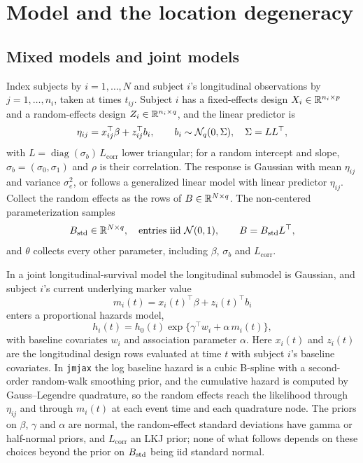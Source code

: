 \section{Model and the location degeneracy}\label{sec:model}

\subsection{Mixed models and joint models}\label{sec:setup}

Index subjects by $i = 1, \dots, N$ and subject $i$'s longitudinal
observations by $j = 1, \dots, n_i$, taken at times $t_{ij}$. Subject $i$
has a fixed-effects design $X_i \in \mathbb{R}^{n_i \times p}$ and a random-effects
design $Z_i \in \mathbb{R}^{n_i \times q}$, and the linear predictor is
\begin{equation}\label{eq:lp}
\eta_{ij} = x_{ij}^{\top}\beta + z_{ij}^{\top} b_i ,
\qquad b_i \sim \mathcal{N}_q(0, \Sigma), \quad \Sigma = L L^{\top},
\end{equation}
with $L = \operatorname{diag}(\sigma_b)\,L_{\mathrm{corr}}$ lower
triangular; for a random intercept and slope, $\sigma_b = (\sigma_0,
\sigma_1)$ and $\rho$ is their correlation. The response is Gaussian with mean $\eta_{ij}$ and variance
$\sigma_e^2$, or follows a generalized linear model with linear predictor
$\eta_{ij}$. Collect the random effects as the rows of $B \in \mathbb{R}^{N \times q}$.
The non-centered parameterization samples
\begin{equation}\label{eq:ncp}
B_{\mathrm{std}} \in \mathbb{R}^{N \times q}, \quad \text{entries iid } \mathcal{N}(0,1),
\qquad B = B_{\mathrm{std}} L^{\top},
\end{equation}
and $\theta$ collects every other parameter, including $\beta$,
$\sigma_b$ and $L_{\mathrm{corr}}$.

In a joint longitudinal-survival model the longitudinal submodel is
Gaussian, and subject $i$'s current underlying marker value
\begin{equation}\label{eq:traj}
m_i(t) = x_i(t)^{\top}\beta + z_i(t)^{\top} b_i
\end{equation}
enters a proportional hazards model,
\begin{equation}\label{eq:hazard}
h_i(t) = h_0(t)\exp\{\gamma^{\top} w_i + \alpha\, m_i(t)\},
\end{equation}
with baseline covariates $w_i$ and association parameter $\alpha$. Here
$x_i(t)$ and $z_i(t)$ are the longitudinal design rows evaluated at time
$t$ with subject $i$'s baseline covariates. In \texttt{jmjax} the log baseline
hazard is a cubic B-spline with a second-order random-walk smoothing prior,
and the cumulative hazard is computed by Gauss--Legendre quadrature, so the
random effects reach the likelihood through $\eta_{ij}$ and through
$m_i(t)$ at each event time and each quadrature node. The priors on
$\beta$, $\gamma$ and $\alpha$ are normal, the random-effect standard
deviations have gamma or half-normal priors, and $L_{\mathrm{corr}}$ an LKJ
prior; none of what follows depends on these choices beyond the prior on
$B_{\mathrm{std}}$ being iid standard normal.

